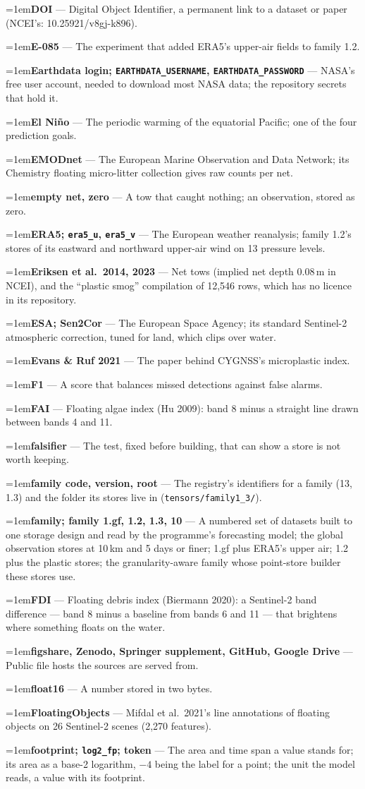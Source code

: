 \documentclass[10pt]{article}
\newcommand{\code}[1]{\texttt{#1}}
\newcommand{\gl}[2]{\par\hangindent=1em\hangafter=1\textbf{#1} --- #2\par}
\begin{document}
\gl{DOI}{Digital Object Identifier, a permanent link to a dataset or paper (NCEI's: 10.25921/v8gj-k896).}
\gl{E-085}{The experiment that added ERA5's upper-air fields to family 1.2.}
\gl{Earthdata login; \code{EARTHDATA\_USERNAME}, \code{EARTHDATA\_PASSWORD}}{NASA's free user account, needed to download most NASA data; the repository secrets that hold it.}
\gl{El Ni\~no}{The periodic warming of the equatorial Pacific; one of the four prediction goals.}
\gl{EMODnet}{The European Marine Observation and Data Network; its Chemistry floating micro-litter collection gives raw counts per net.}
\gl{empty net, zero}{A tow that caught nothing; an observation, stored as zero.}
\gl{ERA5; \code{era5\_u}, \code{era5\_v}}{The European weather reanalysis; family 1.2's stores of its eastward and northward upper-air wind on 13 pressure levels.}
\gl{Eriksen et al.\ 2014, 2023}{Net tows (implied net depth 0.08\,m in NCEI), and the ``plastic smog'' compilation of 12,546 rows, which has no licence in its repository.}
\gl{ESA; Sen2Cor}{The European Space Agency; its standard Sentinel-2 atmospheric correction, tuned for land, which clips over water.}
\gl{Evans \& Ruf 2021}{The paper behind CYGNSS's microplastic index.}
\gl{F1}{A score that balances missed detections against false alarms.}
\gl{FAI}{Floating algae index (Hu 2009): band 8 minus a straight line drawn between bands 4 and 11.}
\gl{falsifier}{The test, fixed before building, that can show a store is not worth keeping.}
\gl{family code, version, root}{The registry's identifiers for a family (13, 1.3) and the folder its stores live in (\code{tensors/\allowbreak family1\_3/}).}
\gl{family; family 1.gf, 1.2, 1.3, 10}{A numbered set of datasets built to one storage design and read by the programme's forecasting model; the global observation stores at 10\,km and 5 days or finer; 1.gf plus ERA5's upper air; 1.2 plus the plastic stores; the granularity-aware family whose point-store builder these stores use.}
\gl{FDI}{Floating debris index (Biermann 2020): a Sentinel-2 band difference --- band 8 minus a baseline from bands 6 and 11 --- that brightens where something floats on the water.}
\gl{figshare, Zenodo, Springer supplement, GitHub, Google Drive}{Public file hosts the sources are served from.}
\gl{float16}{A number stored in two bytes.}
\gl{FloatingObjects}{Mifdal et al.\ 2021's line annotations of floating objects on 26 Sentinel-2 scenes (2,270 features).}
\gl{footprint; \code{log2\_fp}; token}{The area and time span a value stands for; its area as a base-2 logarithm, $-4$ being the label for a point; the unit the model reads, a value with its footprint.}
\end{document}
